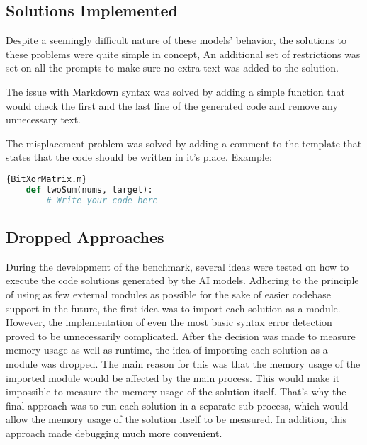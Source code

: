 \subsection{Solutions Implemented}

Despite a seemingly difficult nature of these models' behavior, the solutions to these problems were quite simple in concept, An additional set of restrictions was set on all the prompts to make sure no extra text was added to the solution.

The issue with Markdown syntax was solved by adding a simple function that would check the first and the last line of the generated code and remove any unnecessary text.

The misplacement problem was solved by adding a comment to the template that states that the code should be written in it's place. Example:

\begin{lstlisting}[language=Python]{BitXorMatrix.m}
    def twoSum(nums, target):
        # Write your code here
        \end{lstlisting}
    

\subsection{Dropped Approaches}

During the development of the benchmark, several ideas were tested on how to execute the code solutions generated by the AI models. Adhering to the principle of using as few external modules as possible for the sake of easier codebase support in the future, the first idea was to import each solution as a module. However, the implementation of even the most basic syntax error detection proved to be unnecessarily complicated. After the decision was made to measure memory usage as well as runtime, the idea of importing each solution as a module was dropped. The main reason for this was that the memory usage of the imported module would be affected by the main process. This would make it impossible to measure the memory usage of the solution itself. That's why the final approach was to run each solution in a separate sub-process, which would allow the memory usage of the solution itself to be measured. In addition, this approach made debugging much more convenient.
















